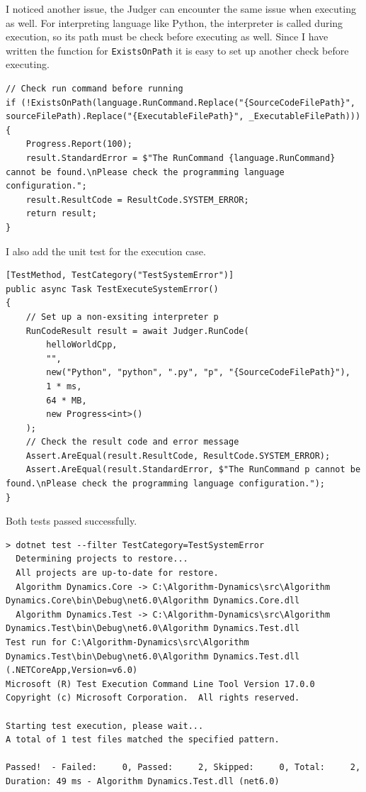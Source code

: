 \documentclass[a4paper]{report}
\newcommand{\code}{\texttt}
\begin{document}
I noticed another issue, the Judger can encounter the same issue when executing as well. For interpreting language like Python, the interpreter is called during execution, so its path must be check before executing as well. Since I have written the function for \code{ExistsOnPath} it is easy to set up another check before executing.

\begin{verbatim}
// Check run command before running
if (!ExistsOnPath(language.RunCommand.Replace("{SourceCodeFilePath}", sourceFilePath).Replace("{ExecutableFilePath}", _ExecutableFilePath)))
{
    Progress.Report(100);
    result.StandardError = $"The RunCommand {language.RunCommand} cannot be found.\nPlease check the programming language configuration.";
    result.ResultCode = ResultCode.SYSTEM_ERROR;
    return result;
}
\end{verbatim}

I also add the unit test for the execution case.

\begin{verbatim}
[TestMethod, TestCategory("TestSystemError")]
public async Task TestExecuteSystemError()
{
    // Set up a non-exsiting interpreter p
    RunCodeResult result = await Judger.RunCode(
        helloWorldCpp,
        "",
        new("Python", "python", ".py", "p", "{SourceCodeFilePath}"),
        1 * ms,
        64 * MB,
        new Progress<int>()
    );
    // Check the result code and error message
    Assert.AreEqual(result.ResultCode, ResultCode.SYSTEM_ERROR);
    Assert.AreEqual(result.StandardError, $"The RunCommand p cannot be found.\nPlease check the programming language configuration.");
}
\end{verbatim}

Both tests passed successfully.

\begin{verbatim}
> dotnet test --filter TestCategory=TestSystemError
  Determining projects to restore...
  All projects are up-to-date for restore.
  Algorithm Dynamics.Core -> C:\Algorithm-Dynamics\src\Algorithm Dynamics.Core\bin\Debug\net6.0\Algorithm Dynamics.Core.dll
  Algorithm Dynamics.Test -> C:\Algorithm-Dynamics\src\Algorithm Dynamics.Test\bin\Debug\net6.0\Algorithm Dynamics.Test.dll
Test run for C:\Algorithm-Dynamics\src\Algorithm Dynamics.Test\bin\Debug\net6.0\Algorithm Dynamics.Test.dll (.NETCoreApp,Version=v6.0)
Microsoft (R) Test Execution Command Line Tool Version 17.0.0
Copyright (c) Microsoft Corporation.  All rights reserved.

Starting test execution, please wait...
A total of 1 test files matched the specified pattern.

Passed!  - Failed:     0, Passed:     2, Skipped:     0, Total:     2, Duration: 49 ms - Algorithm Dynamics.Test.dll (net6.0)
\end{verbatim}
\end{document}
